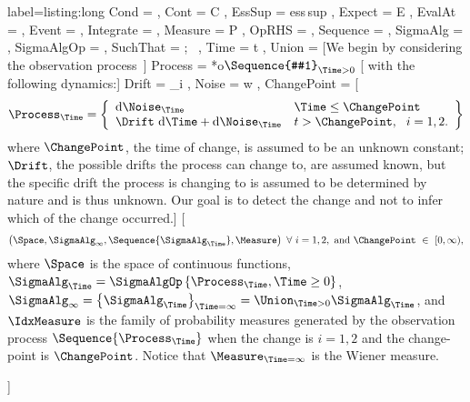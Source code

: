 \documentclass{article} %
\begin{document}
\begin{listing}[Long]
  {label=listing:long}
  \Ccool
  {
    Cond = { \mid },
    Cont = { C },
    EssSup = { \textrm{ess\,sup} },
    Expect = { E },
    EvalAt = ,
    Event = \CcoolLambda{\left\{#1\right\}},
    Integrate = ,
    Measure = { P },
    OpRHS = \CcoolLambda{\left[#1\right]},
    Sequence = \CcoolLambda{\left\{#1\right\}},
    SigmaAlg = {  },
    SigmaAlgOp = { \operatorname{\sigma} },
    SuchThat = { ;~ },
    Time = { t },
    Union = { \cup }                                                      
  }
  [We begin by considering the observation process~]
  { Process = { \xi } }*o{$\Sequence{#1}_{\Time>0}$} 
  [ with the following dynamics:]
  { Drift = { \mu_i }, Noise = { w }, ChangePoint = { \tau } }   
  [\begin{displaymath}
    \Process_{\Time} = \left\{
      \begin{array}{ll}
        \dif\Noise_{\Time}  & \Time \le \ChangePoint \\
        \Drift\, \dif\Time + \dif\Noise_{\Time} &  t > \ChangePoint,~~i=1,2.
      \end{array}\right\}
  \end{displaymath}where $\ChangePoint$, the time of change, is assumed to be an unknown constant; $\Drift$, the possible drifts the process can change to, are assumed known, but the specific drift the process is changing to is assumed to be determined by nature and is thus unknown. Our goal is to detect the change and not to infer which of the change occurred.]{}
  \Ccool[The probability triple is~]
  { Space = { \Cont{[}0,\infty{)} }, IdxMeasure = { \Measure^i_{\ChangePoint} } } 
  [\begin{equation*}
    \left(\Space, \SigmaAlg_{\infty}, \Sequence{\SigmaAlg_{\Time}}, \Measure\right)~\forall~i=1,2,~\rm{and}~\ChangePoint~\in~{[}0,\infty{)},
  \end{equation*}where $\Space$ is the space of continuous functions,
  $\SigmaAlg_{\Time} = \SigmaAlgOp\left\{\Process_{\Time}, \Time \ge 0\right\}$, $\SigmaAlg_{\infty} = \left\{\SigmaAlg_{\Time}\right\}_{\Time=\infty} = \Union_{\Time>0} \SigmaAlg_{\Time}$, and $\IdxMeasure$ is the family of probability measures generated by the observation process $\Sequence{\Process_{\Time}}$ when the change is $i=1,2$ and the change-point is $\ChangePoint$. Notice that $\Measure_{\Time=\infty}$ is the Wiener measure.\par]{}


\end{listing}
\end{document}
